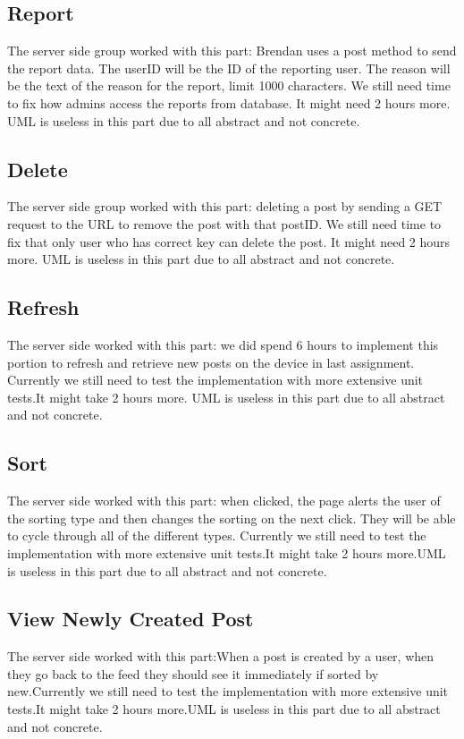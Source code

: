 \documentclass[12pt]{article}
\begin{document}
\subsection{Report}
The server side group worked with this part: Brendan uses a post method to send
the report data. The userID will be the ID of the reporting user. The reason
will be the text of the reason for the report, limit 1000 characters. We still
need time to fix how admins access the reports from database. It might need 2
hours more. UML is useless in this part due to all abstract and not concrete.

\subsection{Delete}
The server side group worked with this part: deleting a post by sending a GET
request to the URL to remove the post with that postID. We still need time to
fix that only user who has correct key can delete the post. It might need 2
hours more. UML is useless in this part due to all abstract and not concrete.

\subsection{Refresh}
The server side worked with this part: we did spend 6 hours to implement this
portion to refresh and retrieve new posts on the device in last assignment.
Currently we still need to test the implementation with more extensive unit
tests.It might take 2 hours more. UML is useless in this part due to all
abstract and not concrete.

\subsection{Sort}
The server side worked with this part: when clicked, the page alerts the user of
the sorting type and then changes the sorting on the next click. They will be
able to cycle through all of the different types. Currently we still need to
test the implementation with more extensive unit tests.It might take 2 hours
more.UML is useless in this part due to all abstract and not concrete.

\subsection{View Newly Created Post}
The server side worked with this part:When a post is created by a user, when
they go back to the feed they should see it immediately if sorted by
new.Currently we still need to test the implementation with more extensive unit
tests.It might take 2 hours more.UML is useless in this part due to all abstract
and not concrete.
\end{document}
